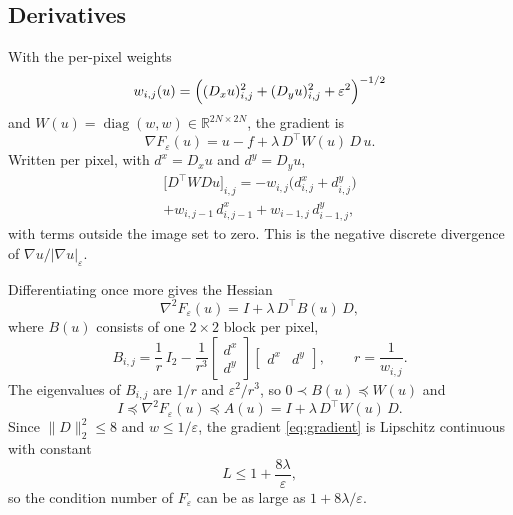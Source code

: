 \documentclass[conference,a4paper]{IEEEtran}
\newcommand{\R}{\mathbb{R}}
\newcommand{\norm}[1]{\lVert #1\rVert}
\DeclareMathOperator{\diag}{diag}
\begin{document}
\subsection{Derivatives}

With the per-pixel weights
\begin{equation}
w_{i,j}(u)=\Bigl((D_xu)_{i,j}^2+(D_yu)_{i,j}^2+\varepsilon^2\Bigr)^{-1/2}
\label{eq:weights}
\end{equation}
and $W(u)=\diag(w,w)\in\R^{2N\times2N}$, the gradient is
\begin{equation}
\nabla F_\varepsilon(u)=u-f+\lambda\,D^\top W(u)\,D\,u.
\label{eq:gradient}
\end{equation}
Written per pixel, with $d^x=D_xu$ and $d^y=D_yu$,
\begin{multline}
\bigl[D^\top WDu\bigr]_{i,j}=-w_{i,j}\bigl(d^x_{i,j}+d^y_{i,j}\bigr)\\
+w_{i,j-1}\,d^x_{i,j-1}+w_{i-1,j}\,d^y_{i-1,j},
\label{eq:divergence}
\end{multline}
with terms outside the image set to zero. This is the negative discrete divergence of $\nabla u/|\nabla u|_\varepsilon$.

Differentiating once more gives the Hessian
\begin{equation}
\nabla^2F_\varepsilon(u)=I+\lambda\,D^\top B(u)\,D,
\label{eq:hessian}
\end{equation}
where $B(u)$ consists of one $2\times2$ block per pixel,
\begin{equation}
B_{i,j}=\frac{1}{r}\,I_2-\frac{1}{r^3}\begin{bmatrix}d^x\\d^y\end{bmatrix}\begin{bmatrix}d^x & d^y\end{bmatrix},\qquad r=\frac{1}{w_{i,j}}.
\label{eq:hessblock}
\end{equation}
The eigenvalues of $B_{i,j}$ are $1/r$ and $\varepsilon^2/r^3$, so $0\prec B(u)\preceq W(u)$ and
\begin{equation}
I\preceq\nabla^2F_\varepsilon(u)\preceq A(u)=I+\lambda\,D^\top W(u)\,D.
\label{eq:bounds}
\end{equation}
Since $\norm{D}_2^2\le8$ and $w\le1/\varepsilon$, the gradient \eqref{eq:gradient} is Lipschitz continuous with constant
\begin{equation}
L\le1+\frac{8\lambda}{\varepsilon},
\label{eq:lipschitz}
\end{equation}
so the condition number of $F_\varepsilon$ can be as large as $1+8\lambda/\varepsilon$.
\end{document}

